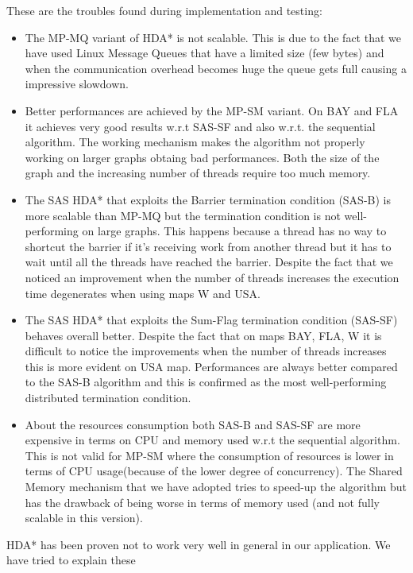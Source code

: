 \documentclass[twocolumn, switch]{article} %
\begin{document}
These are the troubles found during implementation and testing:
\begin{itemize}
  \item The MP-MQ variant of HDA* is not scalable. This is due to the fact that we
        have used Linux Message Queues that have a limited size (few bytes) and when
        the communication overhead becomes huge the queue gets full causing a impressive
        slowdown.
  \item Better performances are achieved by the MP-SM variant. On BAY and FLA it achieves very
        good results w.r.t SAS-SF and also w.r.t. the sequential algorithm. The working mechanism
        makes the algorithm not properly working on larger graphs obtaing bad performances. Both
        the size of the graph and the increasing number of threads require too much memory.
  \item The SAS HDA* that exploits the Barrier termination condition (SAS-B) is more scalable
        than MP-MQ but the termination condition is not well-performing on large graphs. This 
        happens because a thread has no way to shortcut the barrier if it's receiving work from
        another thread but it has to wait until all the threads have reached the barrier. Despite
        the fact that we noticed an improvement when the number of threads increases the execution
        time degenerates when using maps W and USA.
  \item The SAS HDA* that exploits the Sum-Flag termination condition (SAS-SF) behaves overall better.
        Despite the fact that on maps BAY, FLA, W it is difficult to notice the improvements when
        the number of threads increases this is more evident on USA map. Performances are always
        better compared to the SAS-B algorithm and this is confirmed as the most well-performing
        distributed termination condition.
  \item About the resources consumption both SAS-B and SAS-SF are more expensive in terms on CPU and 
        memory used w.r.t the sequential algorithm. This is not valid for MP-SM where the consumption of resources is lower
        in terms of CPU usage(because of the lower degree of concurrency).
        The Shared Memory mechanism that we have adopted tries to speed-up the algorithm
        but has the drawback of being worse in terms of memory used (and not fully scalable in this version).
\end{itemize}
HDA* has been proven not to work very well in general in our application. We have tried to explain these 
\end{document}
